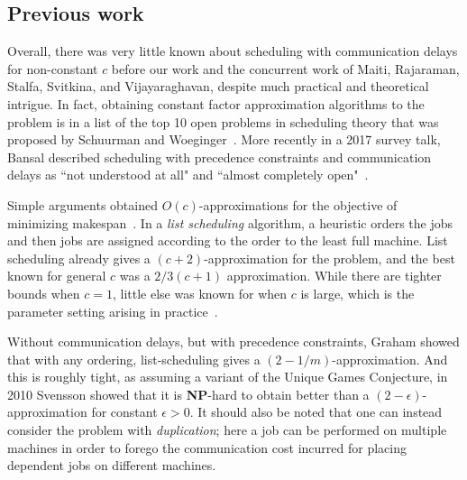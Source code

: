 \subsection{Previous work}

Overall, there was very little known about scheduling with communication delays for non-constant $c$ before our work and the concurrent work of Maiti, Rajaraman, 
Stalfa, Svitkina, and Vijayaraghavan\cite{MRSSV}, despite much practical and theoretical intrigue.
In fact, obtaining constant factor approximation algorithms to the problem is in a list of the top 10 open problems in scheduling theory 
that was proposed by Schuurman and Woeginger~\cite{SW99a}.
More recently in a 2017 survey talk, Bansal described scheduling with precedence constraints and communication delays 
as ``not understood at all" and ``almost completely open"~\cite{Bansalmapsp}.

Simple arguments obtained $O(c)$-approximations for the objective of minimizing makespan~\cite{GrahamListScheduling1966, GiroudeauKMP08}.
In a \emph{list scheduling} algorithm, a heuristic orders the jobs and then jobs are assigned according to the order to the least full machine.
List scheduling already gives a $(c+2)$-approximation for the problem, and the best known for general $c$ was a $2/3(c+1)$ approximation.
While there are tighter bounds when $c=1$, little else was known for when $c$ is large, which is the parameter setting arising in practice~\cite{MunierKonig, HanenMunier73Apx}.

Without communication delays, but with precedence constraints, Graham showed that with any ordering, list-scheduling gives a $(2-1/m)$-approximation.
And this is roughly tight, as assuming a variant of the Unique Games Conjecture, in 2010 Svensson showed that it is \textbf{NP}-hard to obtain better than a $(2-\epsilon)$-approximation 
for constant $\epsilon>0$.
It should also be noted that one can instead consider the problem with \emph{duplication}; here
a job can be performed on multiple machines in order to forego the communication cost incurred for placing dependent jobs on different machines.

